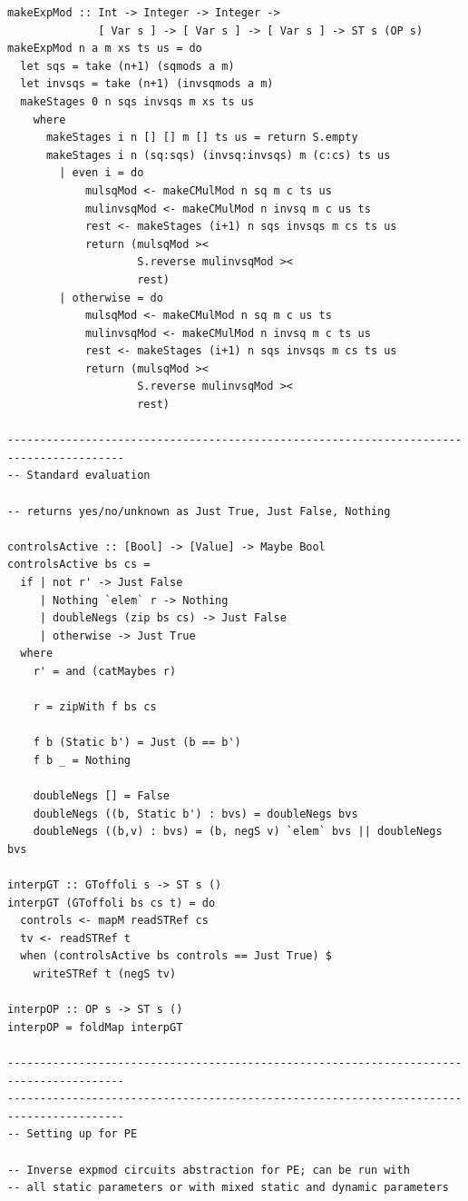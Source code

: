 \documentclass{article}
\begin{document}
\begin{verbatim}
makeExpMod :: Int -> Integer -> Integer ->
              [ Var s ] -> [ Var s ] -> [ Var s ] -> ST s (OP s)
makeExpMod n a m xs ts us = do
  let sqs = take (n+1) (sqmods a m)
  let invsqs = take (n+1) (invsqmods a m)
  makeStages 0 n sqs invsqs m xs ts us
    where
      makeStages i n [] [] m [] ts us = return S.empty
      makeStages i n (sq:sqs) (invsq:invsqs) m (c:cs) ts us
        | even i = do
            mulsqMod <- makeCMulMod n sq m c ts us
            mulinvsqMod <- makeCMulMod n invsq m c us ts
            rest <- makeStages (i+1) n sqs invsqs m cs ts us
            return (mulsqMod ><
                    S.reverse mulinvsqMod ><
                    rest)
        | otherwise = do
            mulsqMod <- makeCMulMod n sq m c us ts
            mulinvsqMod <- makeCMulMod n invsq m c ts us
            rest <- makeStages (i+1) n sqs invsqs m cs ts us
            return (mulsqMod ><
                    S.reverse mulinvsqMod ><
                    rest)

----------------------------------------------------------------------------------------
-- Standard evaluation

-- returns yes/no/unknown as Just True, Just False, Nothing

controlsActive :: [Bool] -> [Value] -> Maybe Bool
controlsActive bs cs =
  if | not r' -> Just False
     | Nothing `elem` r -> Nothing
     | doubleNegs (zip bs cs) -> Just False
     | otherwise -> Just True
  where
    r' = and (catMaybes r)

    r = zipWith f bs cs

    f b (Static b') = Just (b == b')
    f b _ = Nothing

    doubleNegs [] = False
    doubleNegs ((b, Static b') : bvs) = doubleNegs bvs
    doubleNegs ((b,v) : bvs) = (b, negS v) `elem` bvs || doubleNegs bvs

interpGT :: GToffoli s -> ST s ()
interpGT (GToffoli bs cs t) = do
  controls <- mapM readSTRef cs
  tv <- readSTRef t
  when (controlsActive bs controls == Just True) $
    writeSTRef t (negS tv)

interpOP :: OP s -> ST s ()
interpOP = foldMap interpGT

----------------------------------------------------------------------------------------
----------------------------------------------------------------------------------------
-- Setting up for PE

-- Inverse expmod circuits abstraction for PE; can be run with
-- all static parameters or with mixed static and dynamic parameters


\end{verbatim}
\end{document}

